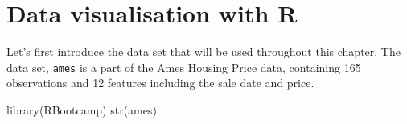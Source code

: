 \documentclass[
]{book}
\newenvironment{Shaded}{\begin{snugshade}}{\end{snugshade}}
\newcommand{\FunctionTok}[1]{\textcolor[rgb]{0.00,0.00,0.00}{#1}}
\newcommand{\NormalTok}[1]{#1}
\begin{document}
\hypertarget{data-visualisation-with-r}{%
\chapter{Data visualisation with R}\label{data-visualisation-with-r}}

Let's first introduce the data set that will be used throughout this chapter. The data set, \texttt{ames} is a part of the Ames Housing Price data, containing 165 observations and 12 features including the sale date and price.

\begin{Shaded}
\begin{Highlighting}[]
\FunctionTok{library}\NormalTok{(RBootcamp)}
\FunctionTok{str}\NormalTok{(ames)}
\end{Highlighting}
\end{Shaded}
\end{document}
